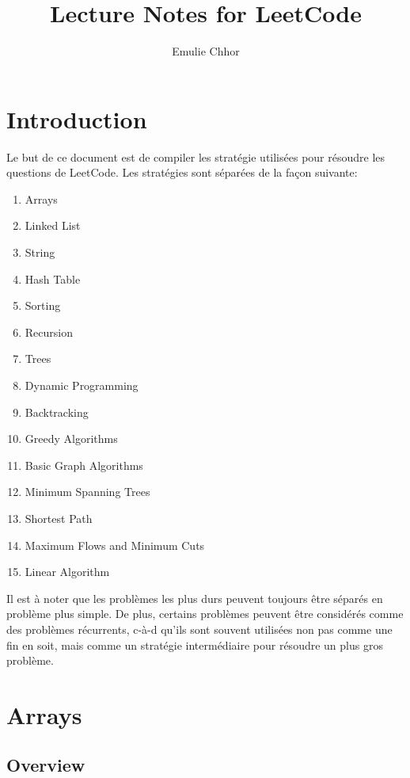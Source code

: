 \documentclass{article}
\begin{document}
\title{Lecture Notes for LeetCode}
\author{Emulie Chhor}
\maketitle

\section*{Introduction}

Le but de ce document est de compiler les stratégie utilisées pour
résoudre les questions de LeetCode. Les stratégies sont séparées de la
façon suivante:

    \begin{enumerate}
	\item Arrays
	\item Linked List
	\item String
	\item Hash Table
	\item Sorting
	\item Recursion
	\item Trees
	\item Dynamic Programming
	\item Backtracking
	\item Greedy Algorithms
	\item Basic Graph Algorithms
	\item Minimum Spanning Trees
	\item Shortest Path
	\item Maximum Flows and Minimum Cuts
	\item Linear Algorithm
    \end{enumerate}

Il est à noter que les problèmes les plus durs peuvent toujours être
séparés en problème plus simple. De plus, certains problèmes peuvent
être considérés comme des problèmes récurrents, c-à-d qu'ils sont
souvent utilisées non pas comme une fin en soit, mais comme un stratégie
intermédiaire pour résoudre un plus gros problème.

\newtheorem{strategy}{Strategy}[subsection]
\newtheorem*{remark}{Remarque}
\newtheorem*{problem}{Problème}
\newtheorem*{intuition}{Intuition}

\section{Arrays}%
\label{sec:Arrays}

\subsection*{Overview}%
\label{sub:Overview}
\end{document}
